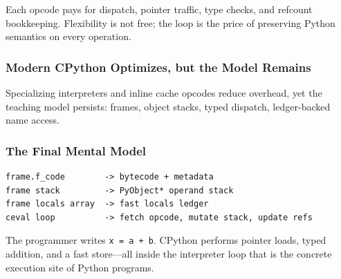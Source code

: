 Each opcode pays for dispatch, pointer traffic, type checks, and refcount bookkeeping. Flexibility is not free; the loop is the price of preserving Python semantics on every operation.

\subsubsection{Modern CPython Optimizes, but the Model Remains}

Specializing interpreters and inline cache opcodes reduce overhead, yet the teaching model persists: frames, object stacks, typed dispatch, ledger-backed name access.

\subsubsection{The Final Mental Model}

\begin{verbatim}
frame.f_code        -> bytecode + metadata
frame stack         -> PyObject* operand stack
frame locals array  -> fast locals ledger
ceval loop          -> fetch opcode, mutate stack, update refs
\end{verbatim}

The programmer writes \texttt{x = a + b}. CPython performs pointer loads, typed addition, and a fast store---all inside the interpreter loop that is the concrete execution site of Python programs.

